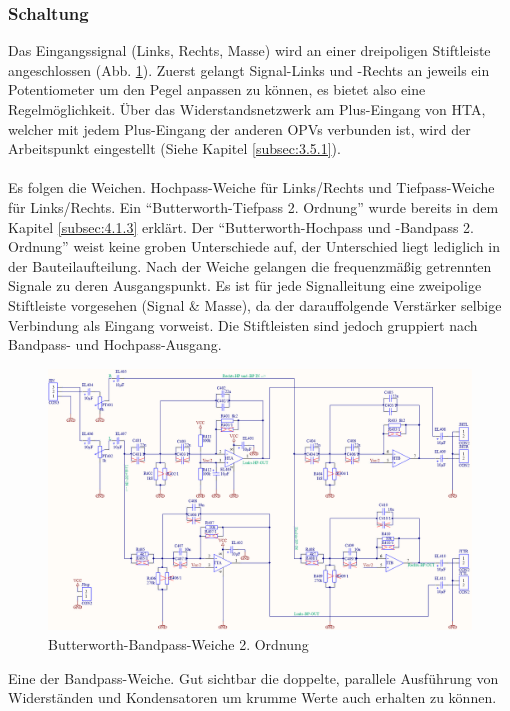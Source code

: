 \subsubsection{Schaltung}\label{subsec:4.3.2}
Das Eingangssignal (Links, Rechts, Masse) wird an einer dreipoligen Stiftleiste angeschlossen (Abb. \ref{fig:4.3.2.1}).
Zuerst gelangt Signal-Links und -Rechts an jeweils ein Potentiometer um den Pegel anpassen zu können, es bietet also eine Regelmöglichkeit.
Über das Widerstandsnetzwerk am Plus-Eingang von HTA, welcher mit jedem Plus-Eingang der anderen OPVs verbunden ist, wird der Arbeitspunkt eingestellt (Siehe Kapitel \ref{subsec:3.5.1}). 
\\ \\
Es folgen die Weichen.
Hochpass-Weiche für Links/Rechts und Tiefpass-Weiche für Links/Rechts.
Ein \enquote{Butterworth-Tiefpass 2. Ordnung} wurde bereits in dem Kapitel \ref{subsec:4.1.3} erklärt.
Der \enquote{Butterworth-Hochpass und -Bandpass 2. Ordnung} weist keine groben Unterschiede auf, der Unterschied liegt lediglich in der Bauteilaufteilung.
Nach der Weiche gelangen die frequenzmäßig getrennten Signale zu deren Ausgangspunkt. Es ist für jede Signalleitung eine zweipolige Stiftleiste vorgesehen (Signal \& Masse), da der darauffolgende Verstärker selbige Verbindung als Eingang vorweist.
Die Stiftleisten sind jedoch gruppiert nach Bandpass- und Hochpass-Ausgang.
\begin{figure} [H]
	\centering	
	\includegraphics[width=1\textwidth]{img/Print4/4_TTuHTWeiche-SchematicV2.PNG}
	\caption{Butterworth-Bandpass-Weiche 2. Ordnung}
	\label {fig:4.3.2.1}
\end{figure}
\newpage
Eine der Bandpass-Weiche.
Gut sichtbar die doppelte, parallele Ausführung von Widerständen und Kondensatoren um krumme Werte auch erhalten zu können.
